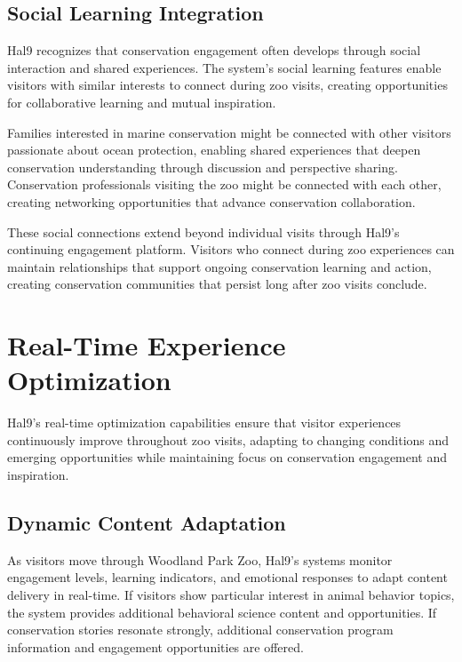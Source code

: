 \documentclass[
  Letterpaper,
]{scrbook}
\begin{document}
\subsection{Social Learning
Integration}\label{social-learning-integration}

Hal9 recognizes that conservation engagement often develops through
social interaction and shared experiences. The system's social learning
features enable visitors with similar interests to connect during zoo
visits, creating opportunities for collaborative learning and mutual
inspiration.

Families interested in marine conservation might be connected with other
visitors passionate about ocean protection, enabling shared experiences
that deepen conservation understanding through discussion and
perspective sharing. Conservation professionals visiting the zoo might
be connected with each other, creating networking opportunities that
advance conservation collaboration.

These social connections extend beyond individual visits through Hal9's
continuing engagement platform. Visitors who connect during zoo
experiences can maintain relationships that support ongoing conservation
learning and action, creating conservation communities that persist long
after zoo visits conclude.

\section{Real-Time Experience
Optimization}\label{real-time-experience-optimization}

Hal9's real-time optimization capabilities ensure that visitor
experiences continuously improve throughout zoo visits, adapting to
changing conditions and emerging opportunities while maintaining focus
on conservation engagement and inspiration.

\subsection{Dynamic Content
Adaptation}\label{dynamic-content-adaptation}

As visitors move through Woodland Park Zoo, Hal9's systems monitor
engagement levels, learning indicators, and emotional responses to adapt
content delivery in real-time. If visitors show particular interest in
animal behavior topics, the system provides additional behavioral
science content and opportunities. If conservation stories resonate
strongly, additional conservation program information and engagement
opportunities are offered.
\end{document}
